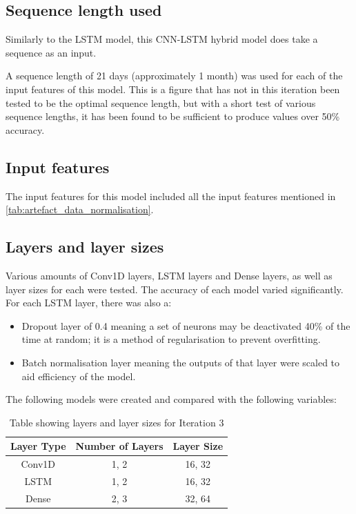 \subsection{Sequence length used}
Similarly to the LSTM model, this CNN-LSTM hybrid model does take a sequence as an input.

A sequence length of 21 days (approximately 1 month) was used for each of the input features of this model.
This is a figure that has not in this iteration been tested to be the optimal sequence length, but with a short
test of various sequence lengths, it has been found to be sufficient to produce values over 50\% accuracy.

\subsection{Input features}
The input features for this model included all the input features mentioned in \autoref{tab:artefact_data_normalisation}.

\subsection{Layers and layer sizes} \label{ssec:iteration3layers}
Various amounts of Conv1D layers, LSTM layers and Dense layers, as well as layer sizes for each were tested. The accuracy of each model varied
significantly. For each LSTM layer, there was also a:
\begin{itemize}
    \item Dropout layer of 0.4 meaning a set of neurons may be
    deactivated 40\% of the time at random; it is a method of regularisation to prevent overfitting.
    \item Batch normalisation layer meaning the outputs of that layer were scaled to aid efficiency of the model.
\end{itemize}

The following models were created and compared with the following variables:

\begin{table}[ht]
    \centering
    \begin{tabular}{|c|c|c|}
        \hline
        Layer Type & Number of Layers & Layer Size \\
        \hline\hline
        Conv1D & 1, 2 & 16, 32 \\
        LSTM & 1, 2 & 16, 32 \\
        Dense & 2, 3 & 32, 64 \\
        \hline
    \end{tabular}
    \caption{Table showing layers and layer sizes for Iteration 3}
    \label{tab:iteration3_layers}
\end{table}
\FloatBarrier

